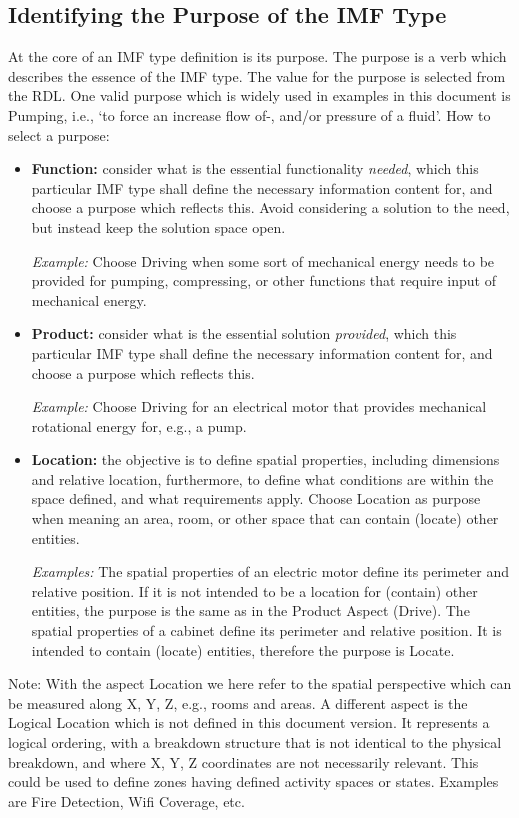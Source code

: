 \documentclass[../main.tex]{subfiles}
\begin{document}
\subsection{Identifying the Purpose of the IMF Type}
At the core of an IMF type definition is its purpose. The purpose is a verb which describes the essence of the IMF type. The value for the purpose is selected from the RDL. One valid purpose which is widely used in examples in this document is Pumping, i.e., `to force an increase flow of-, and/or pressure of a fluid'.
How to select a purpose:
\begin{itemize}
  \item \textbf{Function:} consider what is the essential functionality \emph{needed}, which this particular IMF type shall define the necessary information content for, and choose a purpose which reflects this. Avoid considering a solution to the need, but instead keep the solution space open.

    \emph{Example:} Choose Driving when some sort of mechanical energy needs to be provided for pumping,
                compressing, or other functions that require input of mechanical energy.

  \item \textbf{Product:} consider what is the essential solution \emph{provided}, which this particular IMF type
        shall define the necessary information content for, and choose a purpose which reflects this.

          \textit{Example:} Choose Driving for an electrical motor that provides mechanical rotational energy for, e.g., a pump.


  \item \textbf{Location:} the objective is to define spatial properties, including dimensions and relative location,
        furthermore, to define what conditions are within the space defined, and what requirements apply. Choose Location as purpose when meaning an area, room, or other space that can contain (locate) other entities.

          \textit{Examples:} The spatial properties of an electric motor define its perimeter and relative position. If it
                is not intended to be a location for (contain) other entities, the purpose is the same as in the Product Aspect (Drive). The spatial properties of a cabinet define its perimeter and relative position. It is intended to contain  (locate) entities, therefore the purpose is Locate.

\end{itemize}
Note: With the aspect Location we here refer to the spatial perspective which can be measured along X, Y, Z, e.g., rooms and areas. A different aspect is the Logical Location which is not defined in this document version. It represents a logical ordering, with a breakdown structure that is not identical to the physical breakdown, and where X, Y, Z coordinates are not necessarily relevant. This could be used to define zones having defined activity spaces or states. Examples are Fire Detection, Wifi Coverage, etc.
\end{document}
